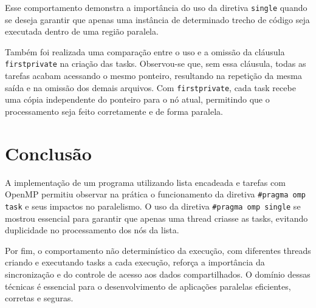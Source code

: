 \documentclass[a4paper, 12pt]{article}
\begin{document}
	Esse comportamento demonstra a importância do uso da diretiva \texttt{single} quando se deseja garantir que apenas uma instância de determinado trecho de código seja executada dentro de uma região paralela.
	
	Também foi realizada uma comparação entre o uso e a omissão da cláusula \texttt{firstprivate} na criação das tasks. Observou-se que, sem essa cláusula, todas as tarefas acabam acessando o mesmo ponteiro, resultando na repetição da mesma saída e na omissão dos demais arquivos. Com \texttt{firstprivate}, cada task recebe uma cópia independente do ponteiro para o nó atual, permitindo que o processamento seja feito corretamente e de forma paralela.
	
	\section{Conclusão}
	
	\hspace{0.7cm}A implementação de um programa utilizando lista encadeada e tarefas com OpenMP permitiu observar na prática o funcionamento da diretiva \texttt{\#pragma omp task} e seus impactos no paralelismo. O uso da diretiva \texttt{\#pragma omp single} se mostrou essencial para garantir que apenas uma thread criasse as tasks, evitando duplicidade no processamento dos nós da lista.
	
	Por fim, o comportamento não determinístico da execução, com diferentes threads criando e executando tasks a cada execução, reforça a importância da sincronização e do controle de acesso aos dados compartilhados. O domínio dessas técnicas é essencial para o desenvolvimento de aplicações paralelas eficientes, corretas e seguras.
	
	
	
	
	
\end{document}

